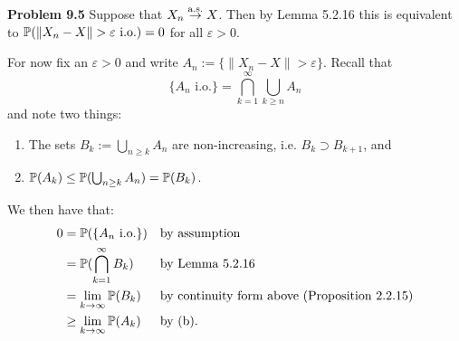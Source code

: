 \bigskip

\textbf{Problem 9.5}
Suppose that $X_n \stackrel{\mathrm{a.s.}}{\rightarrow} X$. Then by Lemma 5.2.16 this is equivalent to $\mathbb P(\|X_n - X\| > \varepsilon \text{ i.o.}) = 0$ for all $\varepsilon > 0$. 

For now fix an $\varepsilon > 0$ and write $A_n := \{\|X_n - X\| > \varepsilon\}$. Recall that
\[
	\{A_n \text{ i.o.}\} = \bigcap_{k = 1}^\infty \bigcup_{k \ge n} A_n
\]
and note two things:
\begin{enumerate}
\item The sets $B_k := \bigcup_{n \ge k} A_n$ are non-increasing, i.e. $B_k \supset B_{k+1}$, and
\item $\mathbb P(A_k) \le \mathbb P(\bigcup_{n \ge k} A_n) = \mathbb P(B_k)$.
\end{enumerate}
 
We then have that:
\begin{align*}
	0 &= \mathbb P(\{A_n \text{ i.o.}\}) &&\text{by assumption} \\
	&= \mathbb P(\bigcap_{k =1}^\infty B_k) &&\text{by Lemma 5.2.16}\\
	&= \lim_{k \to \infty} \mathbb P(B_k) &&\text{by continuity form above (Proposition 2.2.15)}\\
	&\ge \lim_{k \to \infty} \mathbb P(A_k) &&\text{by (b)}.
\end{align*}

\bigskip

